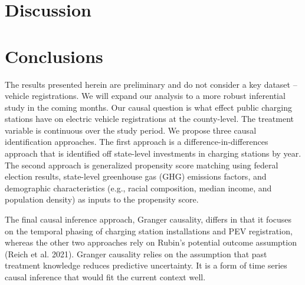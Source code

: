\documentclass[
  letterpaper,
  DIV=11,
  numbers=noendperiod]{scrartcl}
\begin{document}
\hypertarget{discussion}{%
\section{Discussion}\label{discussion}}

\hypertarget{conclusions}{%
\section{Conclusions}\label{conclusions}}

The results presented herein are preliminary and do not consider a key
dataset -- vehicle registrations. We will expand our analysis to a more
robust inferential study in the coming months. Our causal question is
what effect public charging stations have on electric vehicle
registrations at the county-level. The treatment variable is continuous
over the study period. We propose three causal identification
approaches. The first approach is a difference-in-differences approach
that is identified off state-level investments in charging stations by
year. The second approach is generalized propensity score matching using
federal election results, state-level greenhouse gas (GHG) emissions
factors, and demographic characteristics (e.g., racial composition,
median income, and population density) as inputs to the propensity
score.

The final causal inference approach, Granger causality, differs in that
it focuses on the temporal phasing of charging station installations and
PEV registration, whereas the other two approaches rely on Rubin's
potential outcome assumption (Reich et al. 2021). Granger causality
relies on the assumption that past treatment knowledge reduces
predictive uncertainty. It is a form of time series causal inference
that would fit the current context well.

\hypertarget{section}{%
\section*{}\label{section}}
\end{document}
